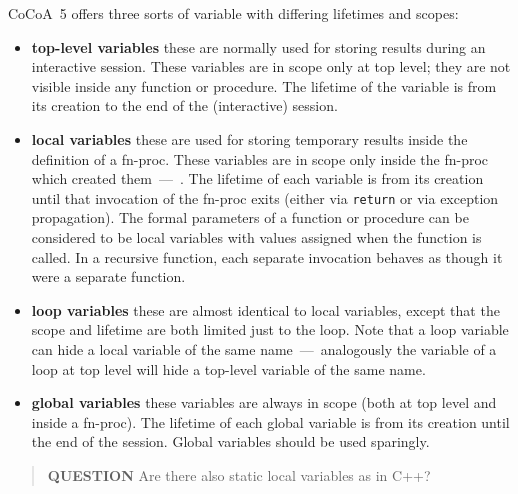 \documentclass{book}[12,a4paper]
\begin{document}
CoCoA~5 offers three sorts of variable with differing lifetimes and scopes:
\begin{itemize}
\item {\bf top-level variables} these are normally used for storing results
  during an interactive session.  These variables are in scope only at top
  level; they are not visible inside any function or procedure.  The
  lifetime of the variable is from its creation to the end of the
  (interactive) session.

\item {\bf local variables} these are used for storing temporary results
  inside the definition of a fn-proc.  These variables are in scope only
  inside the fn-proc which created them~---~.  The lifetime of each variable is
  from its creation until that invocation of the fn-proc exits (either via
  \texttt{return} or via exception propagation).  The formal parameters of a
  function or procedure can be considered to be local variables with values
  assigned when the function is called.  In a recursive function, each
  separate invocation behaves as though it were a separate function.

\item \textbf{loop variables} these are almost identical to local
  variables, except that the scope and lifetime are both limited just to
  the loop.  Note that a loop variable can hide a local variable of the
  same name~---~analogously the variable of a loop at top level will hide a
  top-level variable of the same name.

\item {\bf global variables} these variables are always in scope (both at
  top level and inside a fn-proc).  The lifetime of each global variable is
  from its creation until the end of the session.
  Global variables should be used sparingly.
\end{itemize}

\begin{quote}
\end{quote}

\begin{quote}
  {\bf QUESTION} Are there also static local variables as in C++?
\end{quote}
\end{document}
